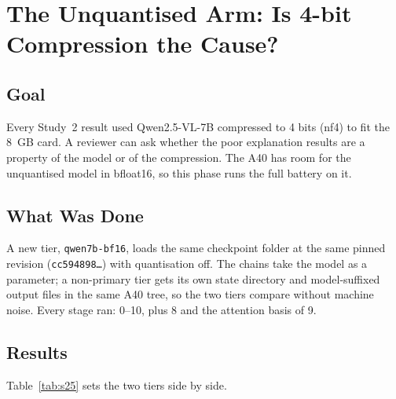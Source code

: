 \chapter{The Unquantised Arm: Is 4-bit Compression the Cause?}
\label{chap:s2-5}

\section{Goal}

Every Study~2 result used Qwen2.5-VL-7B compressed to 4 bits (nf4) to fit the 8~GB card. A reviewer can ask
whether the poor explanation results are a property of the model or of the compression. The A40 has room
for the unquantised model in bfloat16, so this phase runs the full battery on it.

\section{What Was Done}

A new tier, \texttt{qwen7b-bf16}, loads the same checkpoint folder at the same pinned revision
(\texttt{cc594898\ldots}) with quantisation off. The chains take the model as a parameter; a non-primary tier
gets its own state directory and model-suffixed output files in the same A40 tree, so the two tiers compare
without machine noise. Every stage ran: 0--10, plus 8 and the attention basis of 9.

\section{Results}

Table~\ref{tab:s25} sets the two tiers side by side.

